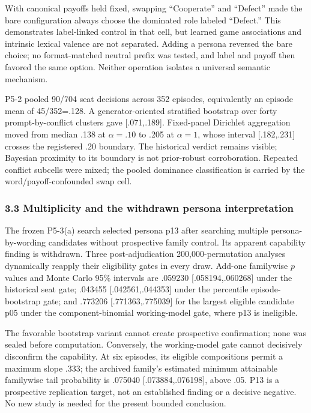 \documentclass[11pt]{article}
\begin{document}
With canonical payoffs held fixed, swapping ``Cooperate'' and ``Defect''
made the bare configuration always choose the dominated role labeled
``Defect.'' This demonstrates label-linked control in that cell, but
learned game associations and intrinsic lexical valence are not
separated. Adding a persona reversed the bare choice; no format-matched
neutral prefix was tested, and label and payoff then favored the same
option. Neither operation isolates a universal semantic mechanism.

P5-2 pooled 90/704 seat decisions across 352 episodes, equivalently an
episode mean of 45/352=.128. A generator-oriented stratified bootstrap
over forty prompt-by-conflict clusters gave {[}.071,.189{]}. Fixed-panel
Dirichlet aggregation moved from median .138 at \(\alpha=.10\) to .205
at \(\alpha=1\), whose interval {[}.182,.231{]} crosses the registered
.20 boundary. The historical verdict remains visible; Bayesian proximity
to its boundary is not prior-robust corroboration. Repeated conflict
subcells were mixed; the pooled dominance classification is carried by
the word/payoff-confounded swap cell.

\subsubsection{3.3 Multiplicity and the withdrawn persona
interpretation}\label{multiplicity-and-the-withdrawn-persona-interpretation}

The frozen P5-3(a) search selected persona p13 after searching multiple
persona-by-wording candidates without prospective family control. Its
apparent capability finding is withdrawn. Three post-adjudication
200,000-permutation analyses dynamically reapply their eligibility gates
in every draw. Add-one familywise \(p\) values and Monte Carlo 95\%
intervals are .059230 {[}.058194,.060268{]} under the historical seat
gate; .043455 {[}.042561,.044353{]} under the percentile
episode-bootstrap gate; and .773206 {[}.771363,.775039{]} for the
largest eligible candidate p05 under the component-binomial
working-model gate, where p13 is ineligible.

The favorable bootstrap variant cannot create prospective confirmation;
none was sealed before computation. Conversely, the working-model gate
cannot decisively disconfirm the capability. At six episodes, its
eligible compositions permit a maximum slope .333; the archived family's
estimated minimum attainable familywise tail probability is .075040
{[}.073884,.076198{]}, above .05. P13 is a prospective replication
target, not an established finding or a decisive negative. No new study
is needed for the present bounded conclusion.
\end{document}
